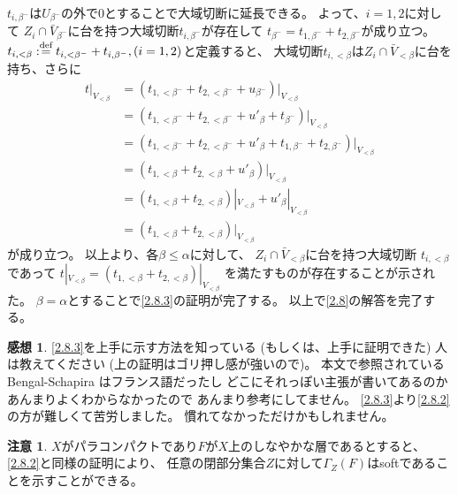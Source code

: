 \documentclass[uplatex,dvipdfmx]{jsarticle}
\makeatletter
\theoremstyle{definition}
\newtheorem*{rem*}{注意}
\newtheorem*{kansou*}{感想}
\renewenvironment{proof}[1][\proofname]{
  \pushQED{\qed}%
  \normalfont \topsep6\p@\@plus6\p@\relax
  \trivlist
  \item[\hskip\labelsep
    #1\@addpunct{\textbf{.}}]\ignorespaces
}{%
  \popQED\endtrivlist\@endpefalse
}
\providecommand{\proofname}{証明}
\def\dfn{:\overset{\mbox{{\scriptsize def}}}{=}}
\makeatother
\begin{document}
\begin{proof}
  \(t_{i,\beta^-}\)は\(U_{\beta^-}\)の外で\(0\)とすることで大域切断に延長できる。
  よって、\(i=1,2\)に対して
  \(Z_i\cap \bar{V}_{\beta^-}\)に台を持つ大域切断\(t_{i,\beta^-}\)が存在して
  \(t_{\beta^-}=t_{1,\beta^-}+t_{2,\beta^-}\)が成り立つ。
  \(t_{i,<\beta}\dfn t_{i,<\beta^-} + t_{i,\beta^-}, (i=1,2)\)と定義すると、
  大域切断\(t_{i,<\beta}\)は\(Z_i\cap \bar{V}_{<\beta}\)に台を持ち、さらに
  \begin{align*}
    t|_{V_{<\beta}}
    &= (t_{1,<\beta^-}+t_{2,<\beta^-} + u_{\beta^-})|_{V_{<\beta}} \\
    &= (t_{1,<\beta^-}+t_{2,<\beta^-} + u'_{\beta} + t_{\beta^-})|_{V_{<\beta}} \\
    &= (t_{1,<\beta^-}+t_{2,<\beta^-} + u'_{\beta}
    + t_{1,\beta^-}+t_{2,\beta^-})|_{V_{<\beta}} \\
    &= (t_{1,<\beta}+t_{2,<\beta} + u'_{\beta})|_{V_{<\beta}} \\
    &= (t_{1,<\beta}+t_{2,<\beta})|_{V_{<\beta}} + u'_{\beta}|_{V_{<\beta}} \\
    &= (t_{1,<\beta}+t_{2,<\beta})|_{V_{<\beta}}
  \end{align*}
  が成り立つ。
  以上より、各\(\beta\leq \alpha\)に対して、
  \(Z_i\cap \bar{V}_{<\beta}\)に台を持つ大域切断
  \(t_{i,<\beta}\)であって
  \(t|_{V_{<\beta}} = (t_{1,<\beta}+t_{2,<\beta})|_{V_{<\beta}}\)
  を満たすものが存在することが示された。
  \(\beta=\alpha\)とすることで\ref{2.8.3}の証明が完了する。
  以上で\autoref{2.8}の解答を完了する。
\end{proof}


\begin{kansou*}
  \ref{2.8.3}を上手に示す方法を知っている (もしくは、上手に証明できた) 人は教えてください
  (上の証明はゴリ押し感が強いので)。
  本文で参照されている Bengal-Schapira はフランス語だったし
  どこにそれっぽい主張が書いてあるのかあんまりよくわからなかったので
  あんまり参考にしてません。
  \ref{2.8.3}より\ref{2.8.2}の方が難しくて苦労しました。
  慣れてなかっただけかもしれません。
\end{kansou*}


\begin{rem*}
  \(X\)がパラコンパクトであり\(F\)が\(X\)上のしなやかな層であるとすると、
  \ref{2.8.2}と同様の証明により、
  任意の閉部分集合\(Z\)に対して\(\Gamma_Z(F)\)はsoftであることを示すことができる。
\end{rem*}
\end{document}
